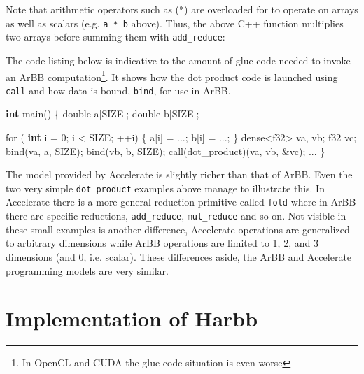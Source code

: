 \documentclass[conference]{IEEEtran}
\newcommand{\cde}[1]{{\footnotesize \tt #1}}
\newcommand{\kw}[1]{{\textbf{#1}}}
\newcommand{\rnote}[1]{\begin{itemize}\item{\textcolor{blue}{#1}}\end{itemize}}
\newcommand{\rnote}[1]{}
\newcommand{\systemname}[0]{{Harbb}}
\begin{document}
Note that arithmetic operators such as (*) are overloaded 
for to operate on arrays as well as scalars (e.g. \cde{a * b} above).
Thus, the above C++ function multiplies two arrays before summing them with \cde {add\_reduce}:

The code listing below is indicative to the amount of glue code needed to invoke an 
ArBB computation\footnote{In OpenCL and CUDA the glue code situation is even worse}. It shows how the dot product code is launched using {\tt call} and 
how data is bound, {\tt bind}, for use in ArBB. 

\vspace{2mm}
\begin{code}
\kw{int} main() 
\{ 
  double a[SIZE];
  double b[SIZE];

  for ( \kw{int} i = 0; i < SIZE; ++i) \{ 
    a[i] = ...; b[i] = ...;
  \}
  dense<f32> va, vb;
  f32 vc;
  bind(va, a, SIZE); 
  bind(vb, b, SIZE); 
  call(dot\_product)(va, vb, &vc); 
  ...
\}
\end{code}



The model provided by Accelerate is slightly richer than that of ArBB.
Even the two very simple \cde {dot\_product} examples above manage to illustrate 
this. In Accelerate there is a more general reduction primitive called \cde {fold} 
where in ArBB there are specific reductions, \cde {add\_reduce}, \cde {mul\_reduce} 
and so on. Not visible in these small examples is another difference, Accelerate 
operations are generalized to arbitrary dimensions while ArBB operations are 
limited to 1, 2, and 3 dimensions (and 0, i.e. scalar). These differences aside,
the ArBB and Accelerate programming models are very similar.


\section{Implementation of \systemname{}} 


\end{document}
